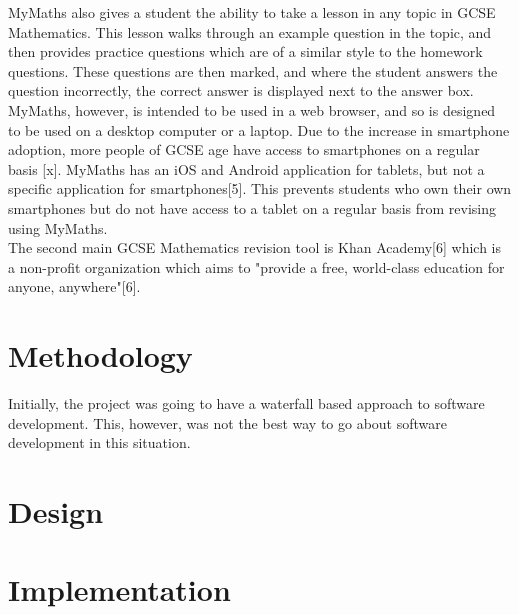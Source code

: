 \documentclass{article}
\begin{document}
MyMaths also gives a student the ability to take a lesson in any topic in GCSE Mathematics. This lesson walks through an example question in the topic, and then provides practice questions which are of a similar style to the homework questions. These questions are then marked, and where the student answers the question incorrectly, the correct answer is displayed next to the answer box. \\

MyMaths, however, is intended to be used in a web browser, and so is designed to be used on a desktop computer or a laptop. Due to the increase in smartphone adoption, more people of GCSE age have access to smartphones on a regular basis [x]. 
MyMaths has an iOS and Android application for tablets, but not a specific application for smartphones[5]. This prevents students who own their own smartphones but do not have access to a tablet on a regular basis from revising using MyMaths. \\

The second main GCSE Mathematics revision tool is Khan Academy[6] which is a non-profit organization which aims to "provide a free, world-class education for anyone, anywhere"[6]. 

\section{Methodology}

Initially, the project was going to have a waterfall based approach to software development. This, however, was not the best way to go about software development in this situation. 


\section{Design}




\section{Implementation}
\end{document}
